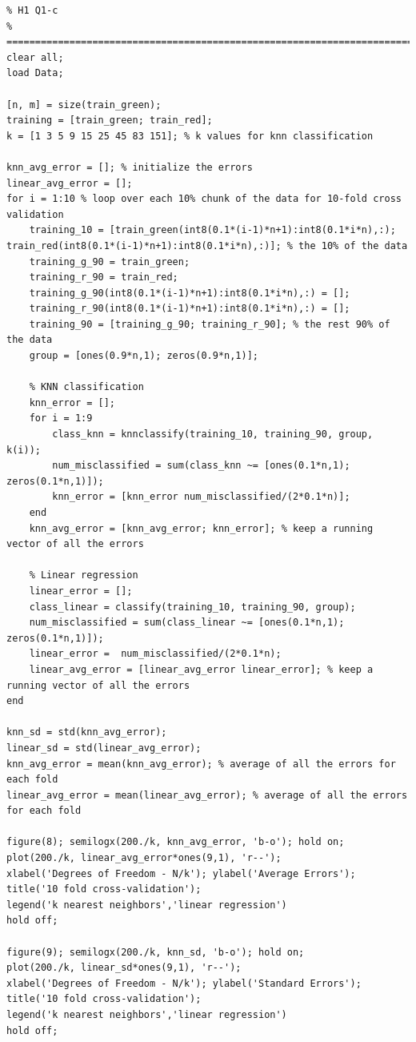 \documentclass[pra,groupedaddress,amsmath,amssymb, column]{revtex4}
\begin{document}
\begin{verbatim}
% H1 Q1-c
% =========================================================================
clear all;
load Data;

[n, m] = size(train_green);
training = [train_green; train_red];
k = [1 3 5 9 15 25 45 83 151]; % k values for knn classification

knn_avg_error = []; % initialize the errors
linear_avg_error = [];
for i = 1:10 % loop over each 10% chunk of the data for 10-fold cross validation
    training_10 = [train_green(int8(0.1*(i-1)*n+1):int8(0.1*i*n),:); train_red(int8(0.1*(i-1)*n+1):int8(0.1*i*n),:)]; % the 10% of the data
    training_g_90 = train_green;
    training_r_90 = train_red;
    training_g_90(int8(0.1*(i-1)*n+1):int8(0.1*i*n),:) = [];
    training_r_90(int8(0.1*(i-1)*n+1):int8(0.1*i*n),:) = [];
    training_90 = [training_g_90; training_r_90]; % the rest 90% of the data
    group = [ones(0.9*n,1); zeros(0.9*n,1)];

    % KNN classification
    knn_error = [];
    for i = 1:9
        class_knn = knnclassify(training_10, training_90, group, k(i));
        num_misclassified = sum(class_knn ~= [ones(0.1*n,1); zeros(0.1*n,1)]);
        knn_error = [knn_error num_misclassified/(2*0.1*n)]; 
    end
    knn_avg_error = [knn_avg_error; knn_error]; % keep a running vector of all the errors
    
    % Linear regression
    linear_error = [];
    class_linear = classify(training_10, training_90, group);
    num_misclassified = sum(class_linear ~= [ones(0.1*n,1); zeros(0.1*n,1)]);
    linear_error =  num_misclassified/(2*0.1*n); 
    linear_avg_error = [linear_avg_error linear_error]; % keep a running vector of all the errors
end

knn_sd = std(knn_avg_error);
linear_sd = std(linear_avg_error);
knn_avg_error = mean(knn_avg_error); % average of all the errors for each fold
linear_avg_error = mean(linear_avg_error); % average of all the errors for each fold

figure(8); semilogx(200./k, knn_avg_error, 'b-o'); hold on;
plot(200./k, linear_avg_error*ones(9,1), 'r--');
xlabel('Degrees of Freedom - N/k'); ylabel('Average Errors');
title('10 fold cross-validation');
legend('k nearest neighbors','linear regression')
hold off;

figure(9); semilogx(200./k, knn_sd, 'b-o'); hold on;
plot(200./k, linear_sd*ones(9,1), 'r--');
xlabel('Degrees of Freedom - N/k'); ylabel('Standard Errors');
title('10 fold cross-validation');
legend('k nearest neighbors','linear regression')
hold off;
\end{verbatim}
\end{document}
